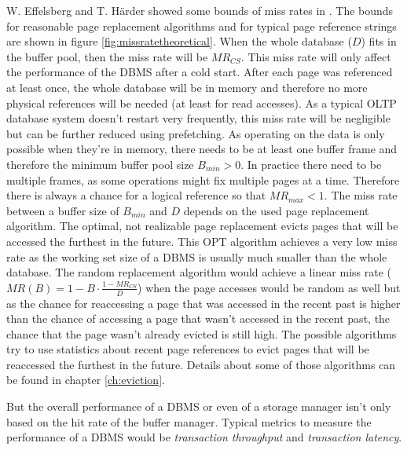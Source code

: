     W. Effelsberg and T. Härder showed some bounds of miss rates in \cite{Effelsberg:1984}. The bounds for reasonable page replacement algorithms and for typical page reference strings are shown in figure \ref{fig:missratetheoretical}. When the whole database ($D$) fits in the buffer pool, then the miss rate will be $MR_{CS}$. This miss rate will only affect the performance of the DBMS after a cold start. After each page was referenced at least once, the whole database will be in memory and therefore no more physical references will be needed (at least for read accesses). As a typical OLTP database system doesn't restart very frequently, this miss rate will be negligible but can be further reduced using prefetching. As operating on the data is only possible when they're in memory, there needs to be at least one buffer frame and therefore the minimum buffer pool  size $B_{min} > 0$. In practice there need to be multiple frames, as some operations might fix multiple pages at a time. Therefore there is always a chance for a logical reference so that $MR_{max} < 1$. The miss rate between a buffer size of $B_{min}$ and $D$ depends on the used page replacement algorithm. The optimal, not realizable page replacement \cite{Belady:1966} evicts pages that will be accessed the furthest in the future. This OPT algorithm achieves a very low miss rate as the working set size of a DBMS is usually much smaller than the whole database. The random replacement algorithm would achieve a linear miss rate ($MR\left(B\right) = 1 - B \cdot \frac{1 - MR_{CS}}{D}$) when the page accesses would be random as well but as the chance for reaccessing a page that was accessed in the recent past is higher than the chance of accessing a page that wasn't accessed in the recent past, the chance that the page wasn't already evicted is still high. The possible algorithms try to use statistics about recent page references to evict pages that will be reaccessed the furthest in the future. Details about some of those algorithms can be found in chapter \ref{ch:eviction}.

    But the overall performance of a DBMS or even of a storage manager isn't only based on the hit rate of the buffer manager. Typical metrics to measure the performance of a DBMS would be \emph{transaction throughput} and \emph{transaction latency}.

